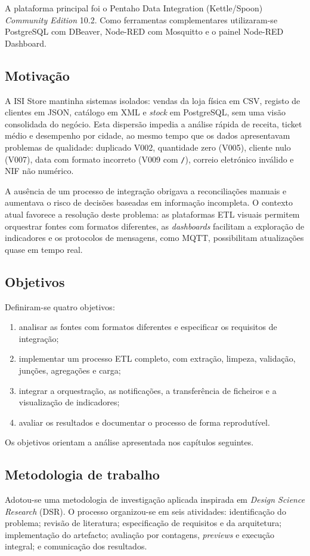 \documentclass[11pt,a4paper]{article}
\begin{document}
A plataforma principal foi o Pentaho Data Integration (Kettle/Spoon) \textit{Community Edition} 10.2. Como ferramentas complementares utilizaram-se PostgreSQL com DBeaver, Node-RED com Mosquitto e o painel Node-RED Dashboard.

\subsection{Motivação}
A ISI Store mantinha sistemas isolados: vendas da loja física em CSV, registo de clientes em JSON, catálogo em XML e \textit{stock} em PostgreSQL, sem uma visão consolidada do negócio. Esta dispersão impedia a análise rápida de receita, ticket médio e desempenho por cidade, ao mesmo tempo que os dados apresentavam problemas de qualidade: duplicado V002, quantidade zero (V005), cliente nulo (V007), data com formato incorreto (V009 com \texttt{/}), correio eletrónico inválido e NIF não numérico.

A ausência de um processo de integração obrigava a reconciliações manuais e aumentava o risco de decisões baseadas em informação incompleta. O contexto atual favorece a resolução deste problema: as plataformas ETL visuais permitem orquestrar fontes com formatos diferentes, as \textit{dashboards} facilitam a exploração de indicadores e os protocolos de mensagens, como MQTT, possibilitam atualizações quase em tempo real.

\subsection{Objetivos}
Definiram-se quatro objetivos:
\begin{enumerate}
\item analisar as fontes com formatos diferentes e especificar os requisitos de integração;
\item implementar um processo ETL completo, com extração, limpeza, validação, junções, agregações e carga;
\item integrar a orquestração, as notificações, a transferência de ficheiros e a visualização de indicadores;
\item avaliar os resultados e documentar o processo de forma reprodutível.
\end{enumerate}
Os objetivos orientam a análise apresentada nos capítulos seguintes.

\subsection{Metodologia de trabalho}
Adotou-se uma metodologia de investigação aplicada inspirada em \textit{Design Science Research} (DSR). O processo organizou-se em seis atividades: identificação do problema; revisão de literatura; especificação de requisitos e da arquitetura; implementação do artefacto; avaliação por contagens, \textit{previews} e execução integral; e comunicação dos resultados.
\end{document}

